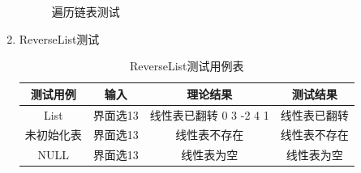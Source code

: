 \documentclass[supercite]{HustGraduPaper}
\theoremstyle{definition}
\begin{document}
\begin{enumerate}
\begin{figure}[htb]
		      \caption{遍历链表测试}
	      \end{figure}
	      \newpage
	\item ReverseList测试
	      \begin{table}[htb]
		      \begin{center}
			      \setlength{\tabcolsep}{2.0mm}
			      \caption{ReverseList测试用例表}
			      \label{table16}
			      \begin{tabular}{|c|c|c|c|}
				      \hline
				      测试用例   & 输入     & 理论结果                               & 测试结果     \\
				      \hline
				      \hline
				      List       & 界面选13 & 线性表已翻转                0 3 -2 4 1 & 线性表已翻转 \\
				      \hline
				      未初始化表 & 界面选13 & 线性表不存在                           & 线性表不存在 \\
				      \hline
				      NULL       & 界面选13 & 线性表为空                             & 线性表为空   \\
				      \hline
			      \end{tabular}
		      \end{center}
	      \end{table}
	      \begin{figure}[htb]
		      \centering
		      \quad
		      \quad
		      \\

\end{figure}
\end{enumerate}
\end{document}
